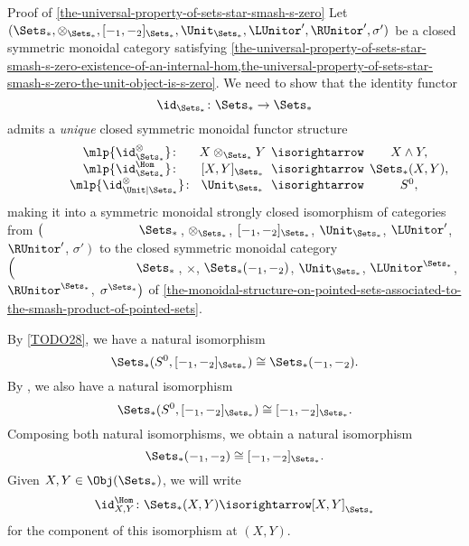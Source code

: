 \begin{Proof}{Proof of \cref{the-universal-property-of-sets-star-smash-s-zero}}%
    Let $(\Sets_{*},\otimes_{\Sets_{*}},[-_{1},-_{2}]_{\Sets_{*}},\Unit_{\Sets_{*}},\LUnitor',\RUnitor',\sigma')$ be a closed symmetric monoidal category satisfying \cref{the-universal-property-of-sets-star-smash-s-zero-existence-of-an-internal-hom,the-universal-property-of-sets-star-smash-s-zero-the-unit-object-is-s-zero}. We need to show that the identity functor
    \[
        \id_{\Sets_{*}}%
        \colon%
        \Sets_{*}%
        \to%
        \Sets_{*}%
    \]%
    admits a \emph{unique} closed symmetric monoidal functor structure
    \[%
        \begin{array}{cccc}
            \phantom{\id^{\otimes}_{\Sets_{*}}}\mlp{\id^{\otimes}_{\Sets_{*}}}       \colon\mkern-10mu & X\otimes_{\Sets_{*}}Y \mkern-10mu&{}\mathbin{\isorightarrow}&\mkern-10mu{}X\wedge Y,\\
            \phantom{\id^{\otimes}_{\Sets_{*}}}\mlp{\id^{\Hom}_{\Sets_{*}}}          \colon\mkern-10mu & [X,Y]_{\Sets_{*}}     \mkern-10mu&{}\mathbin{\isorightarrow}&\mkern-10mu{}\Sets_{*}(X,Y),\\
            \phantom{\id^{\otimes}_{\Sets_{*}}}\mlp{\id^{\otimes}_{\Unit|\Sets_{*}}} \colon\mkern-10mu & \Unit_{\Sets_{*}}     \mkern-10mu&{}\mathbin{\isorightarrow}&\mkern-10mu{}S^{0},
        \end{array}
    \]%
    making it into a symmetric monoidal strongly closed isomorphism of categories from $\left(\phantom{\mrp{\LUnitor'}}\Sets_{*}\right.$, $\otimes_{\Sets_{*}}$, $[-_{1},-_{2}]_{\Sets_{*}}$, $\Unit_{\Sets_{*}}$, $\LUnitor'$, $\RUnitor'$, $\left.\sigma'\right)$ to the closed symmetric monoidal category $\left(\phantom{\mrp{\LUnitor^{\Sets_{*}}}}\Sets_{*}\right.$, $\times$, $\Sets_{*}(-_{1},-_{2})$, $\Unit_{\Sets_{*}}$, $\LUnitor^{\Sets_{*}}$, $\RUnitor^{\Sets_{*}}$, $\left.\sigma^{\Sets_{*}}\right)$ of \cref{the-monoidal-structure-on-pointed-sets-associated-to-the-smash-product-of-pointed-sets}.

    By \cref{TODO28}, we have a natural isomorphism
    \[
        \Sets_{*}(S^{0},[-_{1},-_{2}]_{\Sets_{*}})%
        \cong%
        \Sets_{*}(-_{1},-_{2}).%
    \]%
    By , we also have a natural isomorphism
    \[
        \Sets_{*}(S^{0},[-_{1},-_{2}]_{\Sets_{*}})%
        \cong%
        [-_{1},-_{2}]_{\Sets_{*}}.%
    \]%
    Composing both natural isomorphisms, we obtain a natural isomorphism
    \[
        \Sets_{*}(-_{1},-_{2})%
        \cong%
        [-_{1},-_{2}]_{\Sets_{*}}.%
    \]%
    Given $X,Y\in\Obj(\Sets_{*})$, we will write
    \[
        \id^{\Hom}_{X,Y}%
        \colon%
        \Sets_{*}(X,Y)%
        \isorightarrow%
        [X,Y]_{\Sets_{*}}%
    \]%
    for the component of this isomorphism at $(X,Y)$.


\end{Proof}
